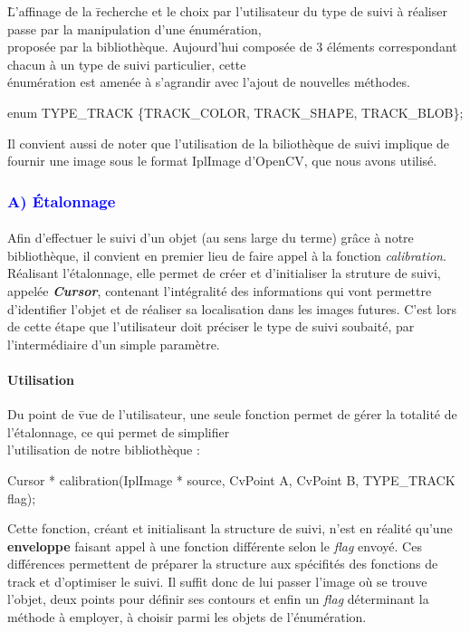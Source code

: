 \documentclass{report}
\begin{document}
				\begin{tabbing}
				\=L'affinage de la \=recherche et le choix par l'utilisateur du type de suivi à réaliser passe par la manipulation d'une énumération,\\ \>proposée par la bibliothèque. Aujourd'hui composée de 3 éléments correspondant chacun à un type de suivi particulier, cette\\ \>énumération est amenée à s'agrandir avec l'ajout de nouvelles méthodes. \\
				\>\>\begin{itshape}enum TYPE\_TRACK \{TRACK\_COLOR, TRACK\_SHAPE, TRACK\_BLOB\};\end{itshape}
				\end{tabbing}
				\quad 
				\quad Il convient aussi de noter que l'utilisation de la biliothèque de suivi implique de fournir une image sous le format IplImage d'OpenCV, que nous avons utilisé.
				\newpage
				\subsubsection{\textcolor{blue}{A) Étalonnage}} \paragraph{}
				Afin d'effectuer le suivi d'un objet (au sens large du terme) grâce à notre bibliothèque, il convient en premier lieu de faire appel à la fonction \textit{calibration}. Réalisant l'étalonnage, elle permet de créer et d'initialiser la struture de suivi, appelée \textbf{\textit{Cursor}}, contenant l'intégralité des informations qui vont permettre d'identifier l'objet et de réaliser sa localisation dans les images futures. C'est lors de cette étape que l'utilisateur doit préciser le type de suivi soubaité, par l'intermédiaire d'un simple paramètre.
					\paragraph{Utilisation}
					\begin{tabbing}
					\quad Du point de \=vue de l'utilisateur, une seule fonction permet de gérer la totalité de l'étalonnage, ce qui permet de simplifier\\ l'utilisation de notre bibliothèque : \\
					\>\begin{itshape}Cursor * calibration(IplImage * source, CvPoint A, CvPoint B, TYPE\_TRACK flag);\end{itshape}
					\end {tabbing}
					\quad Cette fonction, créant et initialisant la structure de suivi, n'est en réalité qu'une \textbf{enveloppe} faisant appel à une fonction différente selon le \textit{flag} envoyé. Ces différences permettent de préparer la structure aux spécifités des fonctions de track et d'optimiser le suivi. Il suffit donc de lui passer l'image où se trouve l'objet, deux points pour définir ses contours et enfin un \textit{flag} déterminant la méthode à employer, à choisir parmi les objets de l'énumération.
\end{document}
